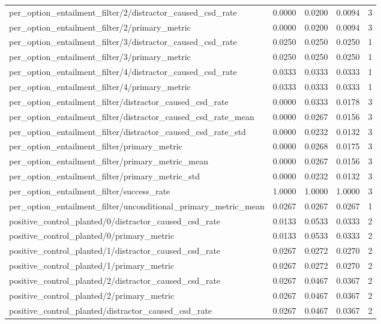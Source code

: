 \begin{table}[h]
\begin{tabular}{lrrrr}
per_option_entailment_filter/2/distractor_caused_csd_rate & 0.0000 & 0.0200 & 0.0094 & 3 \\
per_option_entailment_filter/2/primary_metric & 0.0000 & 0.0200 & 0.0094 & 3 \\
per_option_entailment_filter/3/distractor_caused_csd_rate & 0.0250 & 0.0250 & 0.0250 & 1 \\
per_option_entailment_filter/3/primary_metric & 0.0250 & 0.0250 & 0.0250 & 1 \\
per_option_entailment_filter/4/distractor_caused_csd_rate & 0.0333 & 0.0333 & 0.0333 & 1 \\
per_option_entailment_filter/4/primary_metric & 0.0333 & 0.0333 & 0.0333 & 1 \\
per_option_entailment_filter/distractor_caused_csd_rate & 0.0000 & 0.0333 & 0.0178 & 3 \\
per_option_entailment_filter/distractor_caused_csd_rate_mean & 0.0000 & 0.0267 & 0.0156 & 3 \\
per_option_entailment_filter/distractor_caused_csd_rate_std & 0.0000 & 0.0232 & 0.0132 & 3 \\
per_option_entailment_filter/primary_metric & 0.0000 & 0.0268 & 0.0175 & 3 \\
per_option_entailment_filter/primary_metric_mean & 0.0000 & 0.0267 & 0.0156 & 3 \\
per_option_entailment_filter/primary_metric_std & 0.0000 & 0.0232 & 0.0132 & 3 \\
per_option_entailment_filter/success_rate & 1.0000 & 1.0000 & 1.0000 & 3 \\
per_option_entailment_filter/unconditional_primary_metric_mean & 0.0267 & 0.0267 & 0.0267 & 1 \\
positive_control_planted/0/distractor_caused_csd_rate & 0.0133 & 0.0533 & 0.0333 & 2 \\
positive_control_planted/0/primary_metric & 0.0133 & 0.0533 & 0.0333 & 2 \\
positive_control_planted/1/distractor_caused_csd_rate & 0.0267 & 0.0272 & 0.0270 & 2 \\
positive_control_planted/1/primary_metric & 0.0267 & 0.0272 & 0.0270 & 2 \\
positive_control_planted/2/distractor_caused_csd_rate & 0.0267 & 0.0467 & 0.0367 & 2 \\
positive_control_planted/2/primary_metric & 0.0267 & 0.0467 & 0.0367 & 2 \\
positive_control_planted/distractor_caused_csd_rate & 0.0267 & 0.0467 & 0.0367 & 2 \\

\end{tabular}
\end{table}
